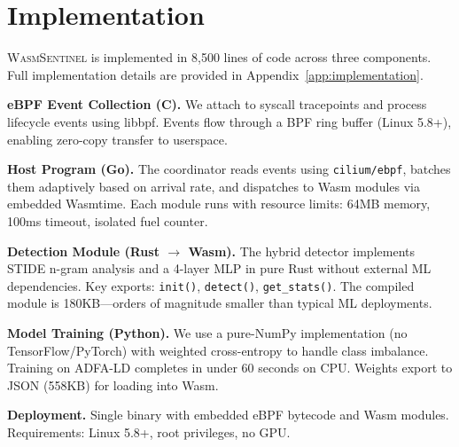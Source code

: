 
\section{Implementation}
\label{sec:implementation}

\textsc{WasmSentinel} is implemented in 8,500 lines of code across three components.
Full implementation details are provided in Appendix~\ref{app:implementation}.

\textbf{eBPF Event Collection (C).}
We attach to syscall tracepoints and process lifecycle events using libbpf.
Events flow through a BPF ring buffer (Linux 5.8+), enabling zero-copy transfer to userspace.

\textbf{Host Program (Go).}
The coordinator reads events using \texttt{cilium/ebpf}, batches them adaptively based on arrival rate, and dispatches to Wasm modules via embedded Wasmtime.
Each module runs with resource limits: 64MB memory, 100ms timeout, isolated fuel counter.

\textbf{Detection Module (Rust $\rightarrow$ Wasm).}
The hybrid detector implements STIDE n-gram analysis and a 4-layer MLP in pure Rust without external ML dependencies.
Key exports: \texttt{init()}, \texttt{detect()}, \texttt{get\_stats()}.
The compiled module is 180KB---orders of magnitude smaller than typical ML deployments.

\textbf{Model Training (Python).}
We use a pure-NumPy implementation (no TensorFlow/PyTorch) with weighted cross-entropy to handle class imbalance.
Training on ADFA-LD completes in under 60 seconds on CPU.
Weights export to JSON (558KB) for loading into Wasm.

\textbf{Deployment.}
Single binary with embedded eBPF bytecode and Wasm modules.
Requirements: Linux 5.8+, root privileges, no GPU.

